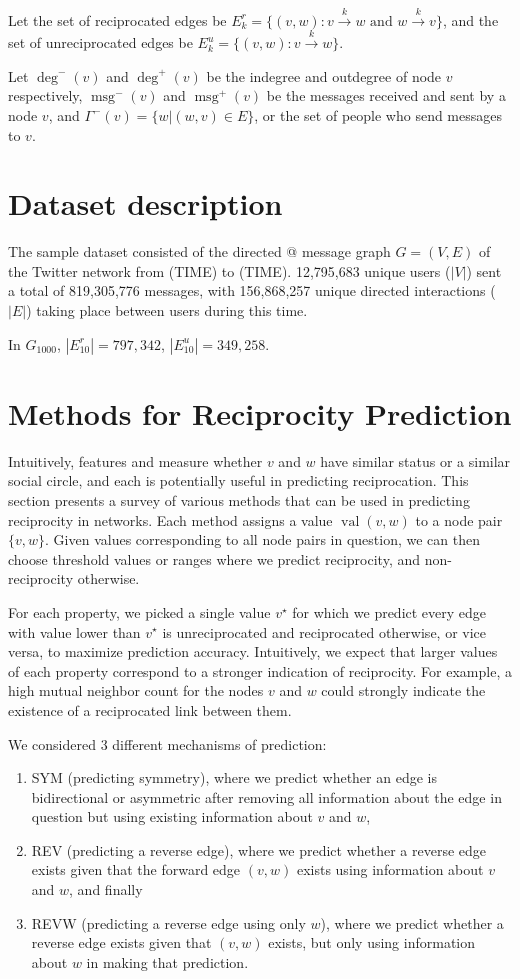 \documentclass[conference]{IEEEtran}
\begin{document}
Let the set of reciprocated edges be \(E_k^r = \{ (v,w) : v \xrightarrow{k} w \text{ and } w \xrightarrow{k} v \} \), and the set of unreciprocated edges be \(E_k^u = \{ (v,w) : v \xrightarrow{k} w\} \).

Let $\deg^-(v)$ and $\deg^+(v)$ be the indegree and outdegree of node $v$ respectively, $\operatorname{msg}^-(v)$ and $\operatorname{msg}^+(v)$ be the messages received and sent by a node $v$, and $\Gamma^-(v) = \{w| (w,v) \in E\}$, or the set of people who send messages to $v$.

\section{Dataset description}
The sample dataset consisted of the directed @ message graph $G=(V,E)$ of the Twitter network from (TIME) to (TIME). 12,795,683 unique users ($|V|$) sent a total of 819,305,776 messages, with 156,868,257 unique directed interactions ($|E|$) taking place between users during this time.

In $G_{1000}$, $|E^r_{10}| = 797,342$, $|E^u_{10}| = 349,258$.

\section{Methods for Reciprocity Prediction}
Intuitively, features and measure whether $v$ and $w$ have similar status or a similar social circle, and each is potentially useful in predicting reciprocation. This section presents a survey of various methods that can be used in predicting reciprocity in networks. Each method assigns a value $\operatorname{val}(v,w)$ to a node pair $\{v,w\}$. Given values corresponding to all node pairs in question, we can then choose threshold values or ranges where we predict reciprocity, and non-reciprocity otherwise.

For each property, we picked a single value $v^\star$ for which we predict every edge with value lower than $v^\star$ is unreciprocated and reciprocated otherwise, or vice versa, to maximize prediction accuracy. Intuitively, we expect that larger values of each property correspond to a stronger indication of reciprocity. For example, a high mutual neighbor count for the nodes $v$ and $w$ could strongly indicate the existence of a reciprocated link between them.

We considered 3 different mechanisms of prediction: 
\begin{enumerate}
\item SYM (predicting symmetry), where we predict whether an edge is bidirectional or asymmetric after removing all information about the edge in question but using existing information about $v$ and $w$, 
\item REV (predicting a reverse edge), where we predict whether a reverse edge exists given that the forward edge $(v,w)$ exists using information about $v$ and $w$, and finally 
\item REVW (predicting a reverse edge using only $w$), where we predict whether a reverse edge exists given that $(v,w)$ exists, but only using information about $w$ in making that prediction.
\end{enumerate}
\end{document}
